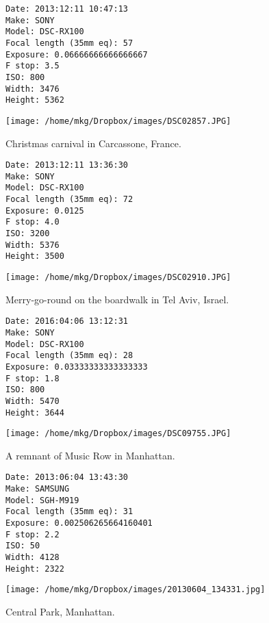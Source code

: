 \begin{lstlisting}
Date: 2013:12:11 10:47:13
Make: SONY
Model: DSC-RX100
Focal length (35mm eq): 57
Exposure: 0.06666666666666667
F stop: 3.5
ISO: 800
Width: 3476
Height: 5362

\end{lstlisting}

\clearpage
\texttt{[image: /home/mkg/Dropbox/images/DSC02857.JPG]}

\clearpage

\noindent Christmas carnival in Carcassone, France.

\begin{lstlisting}
Date: 2013:12:11 13:36:30
Make: SONY
Model: DSC-RX100
Focal length (35mm eq): 72
Exposure: 0.0125
F stop: 4.0
ISO: 3200
Width: 5376
Height: 3500

\end{lstlisting}

\clearpage
\texttt{[image: /home/mkg/Dropbox/images/DSC02910.JPG]}

\clearpage

\noindent Merry-go-round on the boardwalk in Tel Aviv, Israel.

\begin{lstlisting}
Date: 2016:04:06 13:12:31
Make: SONY
Model: DSC-RX100
Focal length (35mm eq): 28
Exposure: 0.03333333333333333
F stop: 1.8
ISO: 800
Width: 5470
Height: 3644

\end{lstlisting}

\clearpage
\texttt{[image: /home/mkg/Dropbox/images/DSC09755.JPG]}

\clearpage

\noindent A remnant of Music Row in Manhattan.

\begin{lstlisting}
Date: 2013:06:04 13:43:30
Make: SAMSUNG
Model: SGH-M919
Focal length (35mm eq): 31
Exposure: 0.002506265664160401
F stop: 2.2
ISO: 50
Width: 4128
Height: 2322

\end{lstlisting}

\clearpage
\texttt{[image: /home/mkg/Dropbox/images/20130604\_134331.jpg]}

\clearpage

\noindent Central Park, Manhattan.

